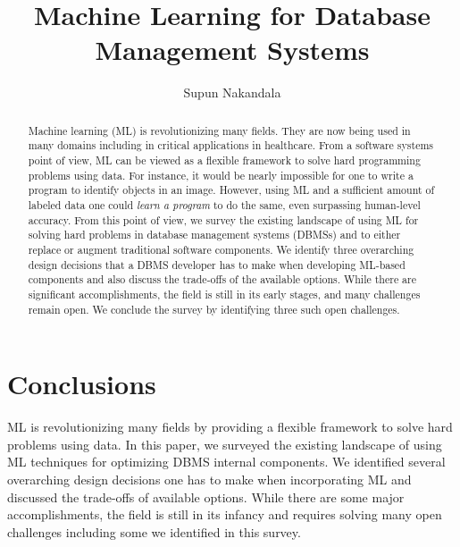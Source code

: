\documentclass[sigconf]{acmart}
\newcommand{\titlename}{Machine Learning for Database Management Systems}
\begin{document}
\sloppy
\title{\titlename}

\author{Supun Nakandala}


\begin{abstract}
Machine learning (ML) is revolutionizing many fields. They are now being used in many domains including in critical applications in healthcare. From a software systems point of view, ML can be viewed as a flexible framework to solve hard programming problems using data. For instance, it would be nearly impossible for one to write a program to identify objects in an image. However, using ML and a sufficient amount of labeled data one could \textit{learn a program} to do the same, even surpassing human-level accuracy. From this point of view, we survey the existing landscape of using ML for solving hard problems in database management systems (DBMSs) and to either replace or augment traditional software components. We identify three overarching design decisions that a DBMS developer has to make when developing ML-based components and also discuss the trade-offs of the available options. While there are significant accomplishments, the field is still in its early stages, and many challenges remain open. We conclude the survey by identifying three such open challenges.
\end{abstract}

\maketitle









\section{Conclusions}
ML is revolutionizing many fields by providing a flexible framework to solve hard problems using data.
In this paper, we surveyed the existing landscape of using ML techniques for optimizing DBMS internal components.
We identified several overarching design decisions one has to make when incorporating ML and discussed the trade-offs of available options.
While there are some major accomplishments, the field is still in its infancy and requires solving many open challenges including some we identified in this survey.




\balance

\end{document}

